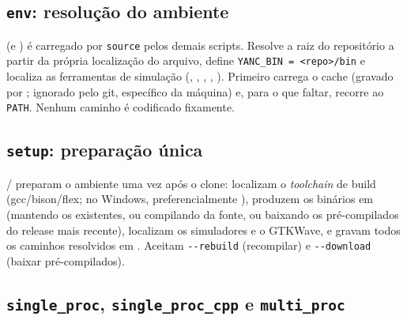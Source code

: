 \subsection{\texttt{env}: resolução do ambiente}
\label{sec:yanc-env}

 (e ) é carregado por \lstinline|source| pelos demais
scripts. Resolve a raiz do repositório a partir da própria localização do arquivo,
define \lstinline|YANC_BIN = <repo>/bin| e localiza as ferramentas de simulação
(, , , , ).
Primeiro carrega o cache  (gravado por ;
ignorado pelo git, específico da máquina) e, para o que faltar, recorre ao
\lstinline|PATH|. Nenhum caminho é codificado fixamente.

\subsection{\texttt{setup}: preparação única}
\label{sec:yanc-setup}

/ preparam o ambiente uma vez após o clone:
localizam o \emph{toolchain} de build (gcc/bison/flex; no Windows,
preferencialmente ), produzem os binários em
 (mantendo os existentes, ou compilando da fonte, ou baixando os
pré-compilados do release mais recente), localizam os simuladores e o GTKWave, e
gravam todos os caminhos resolvidos em . Aceitam
\lstinline|--rebuild| (recompilar) e \lstinline|--download| (baixar
pré-compilados).

\subsection{\texttt{single\_proc}, \texttt{single\_proc\_cpp} e \texttt{multi\_proc}}
\label{sec:yanc-runners}

